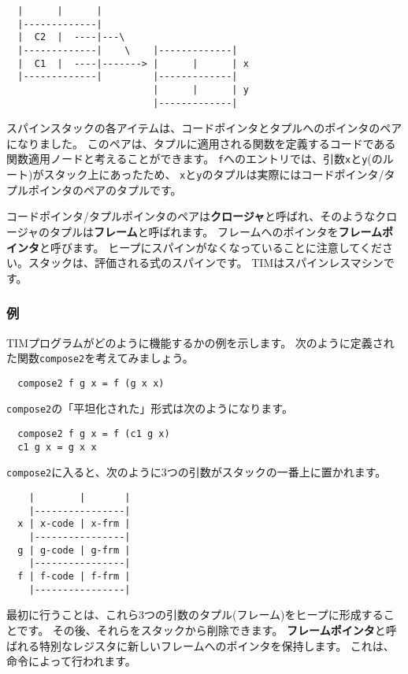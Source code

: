 \documentclass{jarticle}
\begin{document}
\begin{verbatim}
  |      |      |
  |-------------|
  |  C2  |  ----|---\
  |-------------|    \    |-------------|
  |  C1  |  ----|-------> |      |      | x
  |-------------|         |-------------|
                          |      |      | y
                          |-------------|
\end{verbatim}

スパインスタックの各アイテムは、コードポインタとタプルへのポインタのペアになりました。
このペアは、タプルに適用される関数を定義するコードである関数適用ノードと考えることができます。
\texttt{f}へのエントリでは、引数\texttt{x}と\texttt{y}(のルート)がスタック上にあったため、
\texttt{x}と\texttt{y}のタプルは実際にはコードポインタ/タプルポインタのペアのタプルです。

コードポインタ/タプルポインタのペアは\textbf{クロージャ}と呼ばれ、そのようなクロージャのタプルは\textbf{フレーム}と呼ばれます。
フレームへのポインタを\textbf{フレームポインタ}と呼びます。
ヒープにスパインがなくなっていることに注意してください。スタックは、評価される式のスパインです。
TIMはスパインレスマシンです。

\subsubsection{例}

TIMプログラムがどのように機能するかの例を示します。
次のように定義された関数\texttt{compose2}を考えてみましょう。

\begin{verbatim}
  compose2 f g x = f (g x x)
\end{verbatim}

\texttt{compose2}の「平坦化された」形式は次のようになります。

\begin{verbatim}
  compose2 f g x = f (c1 g x)
  c1 g x = g x x
\end{verbatim}

\texttt{compose2}に入ると、次のように3つの引数がスタックの一番上に置かれます。

\begin{verbatim}
    |        |       |
    |----------------|
  x | x-code | x-frm |
    |----------------|
  g | g-code | g-frm |
    |----------------|
  f | f-code | f-frm |
    |----------------|
\end{verbatim}

最初に行うことは、これら3つの引数のタプル(フレーム)をヒープに形成することです。
その後、それらをスタックから削除できます。
\textbf{フレームポインタ}と呼ばれる特別なレジスタに新しいフレームへのポインタを保持します。
これは、命令によって行われます。
\end{document}
